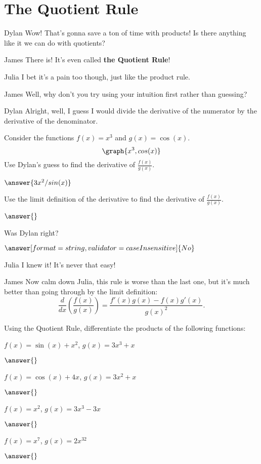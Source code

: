 \documentclass{ximera}
\begin{document}
\section{The Quotient Rule}
\begin{dialogue}
\item[Dylan] Wow! That's gonna save a ton of time with products! Is there anything like it we can do with quotients?
\item[James] There is! It's even called \textbf{the Quotient Rule}!
\item[Julia] I bet it's a pain too though, just like the product rule.
\item[James] Well, why don't you try using your intuition first rather than guessing?
\item[Dylan] Alright, well, I guess I would divide the derivative of the numerator by the derivative of the denominator.
\end{dialogue}
\begin{question}
Consider the functions $f(x) = x^3$ and $g(x) = \cos(x)$.
\[
\graph{x^3, cos(x)}
\]
Use Dylan's guess to find the derivative of $\frac{f(x)}{g(x)}$.

$\answer{3x^2/sin(x)}$

Use the limit definition of the derivative to find the derivative of $\frac{f(x)}{g(x)}$.

$\answer{}$

Was Dylan right?

$\answer[format=string,validator=caseInsensitive]{No}$
\end{question}
\begin{dialogue}
\item[Julia] I knew it! It's never that easy!
\item[James] Now calm down Julia, this rule is worse than the last one, but it's much better than going through by the limit definition:  $$\frac{d}{dx}\left( \frac{f(x)}{g(x)}\right) = \frac{f'(x)g(x)-f(x)g'(x)}{g(x)^2}\text{.}$$
\end{dialogue}
\begin{question}
Using the Quotient Rule, differentiate the products of the following functions:

$f(x) = \sin(x)+x^2$, $g(x) = 3x^3+x$

$\answer{}$

$f(x) = \cos(x)+4x$, $g(x) = 3x^2+x$

$\answer{}$

$f(x) = x^2$, $g(x) = 3x^3-3x$

$\answer{}$

$f(x) = x^7$, $g(x) = 2x^{32}$

$\answer{}$
\end{question}
\end{document}

